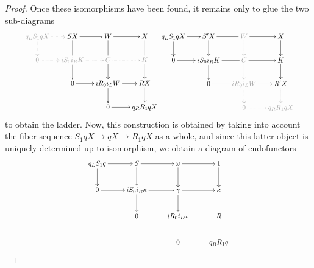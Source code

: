 \begin{proof}
Once these isomorphisms have been found, it remains only to glue the two sub\hyp{}diagrams
$$\scalebox{.8}{
\xymatrix@R=7mm@C=4mm{
 \gray{q_L S_1 qX}	& SX	& W	& X \\
 \gray{0}	& \gray{iS_0 i_R K}	& \gray{C}	& \gray{K} \\
 	& 0	& i R_0 i_L W	& RX \\
 	& 	& 0	& q_R R_1 q X
 \ar@{.>}@[semilightgray] "1,1";"1,2" 
 \ar@{.>}@[semilightgray] "1,1";"2,1" 
 \ar "1,2";"1,3" 
 \ar@{-} "1,2";"2,2" 
 \ar "1,3";"1,4" 
 \ar@{-} "1,3";"2,3" 
 \ar@{-} "1,4";"2,4" 
 \ar@{.>}@[semilightgray] "2,1";"2,2" 
 \ar@{.>}@[semilightgray] "2,2";"2,3" 
 \ar "2,2";"3,2" 
 \ar@{.>}@[semilightgray] "2,3";"2,4" 
 \ar "2,3";"3,3" 
 \ar "2,4";"3,4" 
 \ar "3,2";"3,3" 
 \ar "3,3";"3,4" 
 \ar "3,3";"4,3" 
 \ar "3,4";"4,4" 
 \ar "4,3";"4,4" 
}
	\xymatrix@R=7mm@C=4mm{
	  q_L S_1 qX	& S'X	& \gray{W}	& X \\
	  0	& iS_0 i_R K	& \gray{C}	& K \\
	  	& 0	& \gray{i R_0 i_L W}	& R'X \\
	  	& 	& \gray{0}	& \gray{q_R R_1 q X}
	  \ar "1,1";"1,2" 
	  \ar "1,1";"2,1" 
	  \ar@{-} "1,2";"1,3" 
	  \ar "1,2";"2,2" 
	  \ar "1,3";"1,4" 
	  \ar@{.>}@[semilightgray] "1,3";"2,3" 
	  \ar "1,4";"2,4" 
	  \ar "2,1";"2,2" 
	  \ar@{-} "2,2";"2,3" 
	  \ar "2,2";"3,2" 
	  \ar "2,3";"2,4" 
	  \ar@{.>}@[semilightgray] "2,3";"3,3" 
	  \ar "2,4";"3,4" 
	  \ar@{-} "3,2";"3,3" 
	  \ar "3,3";"3,4" 
	  \ar@{.>}@[semilightgray] "3,3";"4,3" 
	  \ar@{.>}@[semilightgray] "3,4";"4,4" 
	  \ar@{.>}@[semilightgray] "4,3";"4,4" 
	}
}$$
to obtain the ladder. Now, this construction is obtained by taking into account the fiber sequence $S_1 q X\to q X\to R_1 q X$ as a whole, and since this latter object is uniquely determined up to isomorphism, we obtain a diagram of endofunctors
\[\label{ladder:arrows}
	\scalebox{.8}{\xymatrix{
	                q_L S_1 q	& S	& \omega	& 1 \\
	                0	& iS_0 i_R \kappa	& \gamma	& \kappa \\
	                	& 0	& i R_0 i_L \omega	& R \\
	                	& 	& 0	& q_R R_1 q
	                \ar "1,1";"1,2" 
	                \ar "1,1";"2,1" 
	                \ar "1,2";"1,3" 
	                \ar "1,2";"2,2" 
	                \ar "1,3";"1,4" 
	                \ar "1,3";"2,3" 
	                \ar "1,4";"2,4" 
	                \ar "2,1";"2,2" 
	                \ar "2,2";"2,3" 
	                \ar "2,2";"3,2" 
	                \ar "2,3";"2,4" 
	                \ar "2,3";"3,3" 
}}\]
\end{proof}
